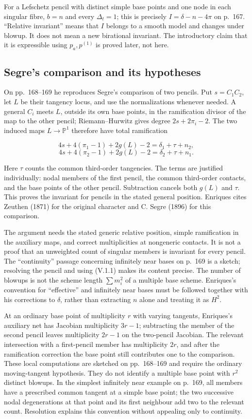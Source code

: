 For a Lefschetz pencil with distinct simple base points and one node in each singular fibre, \(b=n\) and every \(\Delta_t=1\); this is precisely \(I=\delta-n-4\pi\) on p.~167. ``Relative invariant'' means that \(I\) belongs to a smooth model and changes under blowup. It does not mean a new birational invariant. The introductory claim that it is expressible using \(p_a,p^{(1)}\) is proved later, not here.

\subsection{Segre's comparison and its hypotheses}

On pp.~168--169 he reproduces Segre's comparison of two pencils. Put \(s=C_1C_2\), let \(L\) be their tangency locus, and use the normalizations whenever needed. A general \(C_i\) meets \(L\), outside its own base points, in the ramification divisor of the map to the other pencil; Riemann--Hurwitz gives degree \(2s+2\pi_i-2\). The two induced maps \(L\to\mathbb P^1\) therefore have total ramification

\[
4s+4(\pi_1-1)+2g(L)-2=\delta_1+\tau+n_2,
\] \[
4s+4(\pi_2-1)+2g(L)-2=\delta_2+\tau+n_1.
\]

Here \(\tau\) counts the common third-order tangencies. The terms are justified individually: nodal members of the first pencil, the common third-order contacts, and the base points of the other pencil. Subtraction cancels both \(g(L)\) and \(\tau\). This proves the invariant for pencils in the stated general position. Enriques cites Zeuthen (1871) for the original character and C. Segre (1896) for this comparison.

The argument needs the stated generic relative position, simple ramification in the auxiliary maps, and correct multiplicities at nongeneric contacts. It is not a proof that an unweighted count of singular members is invariant for every pencil. The ``continuity'' passage concerning infinitely near bases on p.~169 is a sketch; resolving the pencil and using (V.1.1) makes its content precise. The number of blowups is not the scheme length \(\sum m_i^2\) of a multiple base scheme. Enriques's convention for ``effective'' and infinitely near bases must be followed together with his corrections to \(\delta\), rather than extracting \(n\) alone and treating it as \(H^2\).

At an ordinary base point of multiplicity \(r\) with varying tangents, Enriques's auxiliary net has Jacobian multiplicity \(3r-1\); subtracting the member of the second pencil leaves multiplicity \(2r-1\) on the two-pencil Jacobian. The relevant intersection with a first-pencil member has multiplicity \(2r\), and after the ramification correction the base point still contributes one to the comparison. These local computations are sketched on pp.~168--169 and require the ordinary moving-tangent hypothesis. They do not identify a multiple base point with \(r^2\) distinct blowups. In the simplest infinitely near example on p.~169, all members have a prescribed common tangent at a simple base point; the two successive nodal degenerations at that point and its first neighbour add two to the relevant count. Resolution explains this convention without appealing only to continuity.

